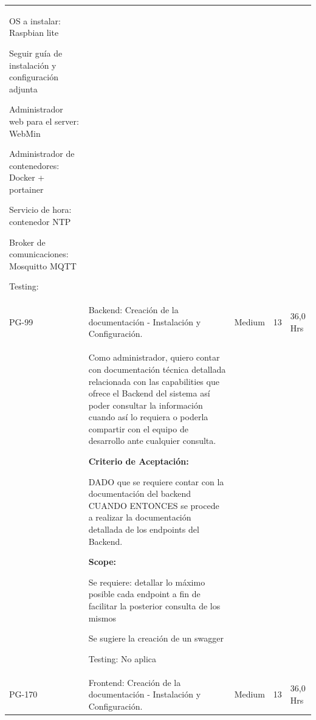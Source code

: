 \documentclass[11pt]{charter}
\begin{document}
\begin{landscape}
\begin{tabularx}{\linewidth}{@{}|p{1.3cm}|p{17cm}|p{1.7cm}|p{1.5cm}|p{1.7cm}|@{}}
\begin{description}
\begin{description}
                         \item OS a instalar: Raspbian lite 
                         \item Seguir guía de instalación y configuración adjunta 			   
                         \item Administrador web para el server: WebMin 			   
                         \item Administrador de contenedores: Docker + portainer 				
                         \item Servicio de hora: contenedor NTP					   			   
                         \item Broker de comunicaciones: Mosquitto MQTT  
					\end{description}
                   \item Testing:
            \end{description} &  &     & \\
PG-99    & Backend: Creación de la   documentación - Instalación y Configuración.               & Medium             & 13  & 36,0  Hrs         \\
         &  \begin{description}
                   \item Como administrador, quiero   contar con documentación técnica detallada relacionada con las capabilities   que ofrece el Backend del sistema así poder consultar la información cuando   
				 así lo requiera o poderla compartir con el equipo de desarrollo ante cualquier   consulta.                 
                   \item \textbf{Criterio de Aceptación:}
                   \item DADO que se requiere contar con la documentación del backend CUANDO       ENTONCES se procede a realizar la documentación detallada de los endpoints   del Backend.                
                   \item \textbf{Scope:}
                         \item Se requiere: detallar lo máximo posible cada endpoint a fin de facilitar   la posterior consulta de los mismos 
                         \item Se sugiere la creación de un swagger                 
                   \item Testing: No aplica
            \end{description}            &  &     & \\
PG-170   & Frontend: Creación de la   documentación - Instalación y Configuración.              & Medium             & 13  & 36,0  Hrs         \\

\end{tabularx}
\end{landscape}
\end{document}
